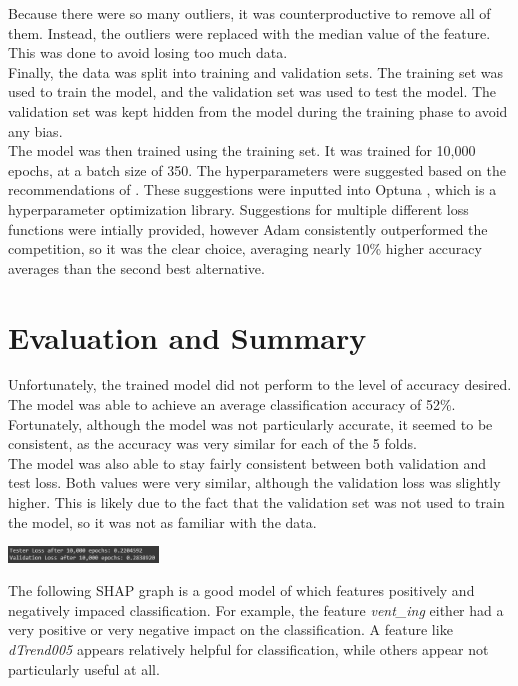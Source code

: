\documentclass{article}[12pt]
\begin{document}
\indent
Because there were so many outliers, it was counterproductive to remove all of them. Instead, the outliers were replaced with the median value of the feature. This was done to avoid losing too much data.\\
\indent
Finally, the data was split into training and validation sets. The training set was used to train the model, and the validation set was used to test the model. The validation set was kept hidden from the model during the training phase to avoid any bias.\\
\indent
The model was then trained using the training set. It was trained for 10,000 epochs, at a batch size of 350. The hyperparameters were suggested based on the recommendations of \cite{Design_NN_Medium}. These suggestions were inputted into Optuna \cite{optuna_2019}, which is a hyperparameter optimization library. Suggestions for multiple different loss functions were intially provided, however Adam consistently outperformed the competition, so it was the clear choice, averaging nearly 10\% higher accuracy averages than the second best alternative.\\


\section*{Evaluation and Summary}

Unfortunately, the trained model did not perform to the level of accuracy desired. The model was able to achieve an average classification accuracy of 52\%. Fortunately, although the model was not particularly accurate, it seemed to be consistent, as the accuracy was very similar for each of the 5 folds.\\
\indent
The model was also able to stay fairly consistent between both validation and test loss. Both values were very similar, although the validation loss was slightly higher. This is likely due to the fact that the validation set was not used to train the model, so it was not as familiar with the data.\\

\begin{center}
    \includegraphics[width=0.3\textwidth]{loss.png}
\end{center}

\indent
The following SHAP graph is a good model of which features positively and negatively impaced classification. For example, the feature \emph{vent\_ing} either had a very positive or very negative impact on the classification. A feature like \emph{dTrend005} appears relatively helpful for classification, while others appear not particularly useful at all.\\
\end{document}
